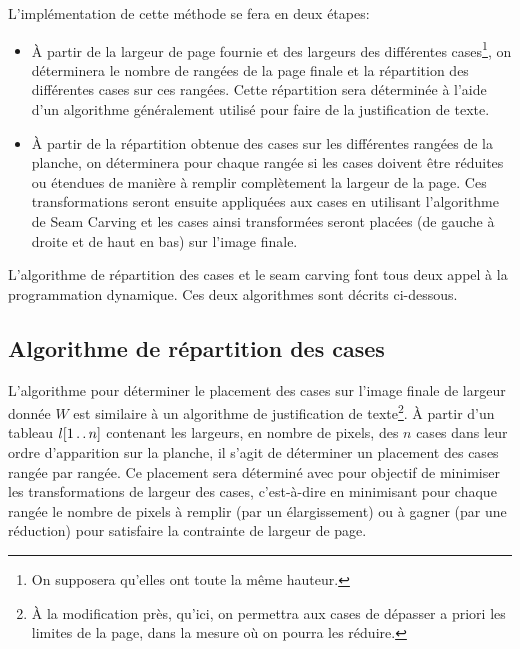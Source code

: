 \documentclass[a4paper,10pt]{article}
\begin{document}
L'implémentation de cette méthode se fera en deux étapes:
\begin{itemize}
\item \`A partir de la largeur de page fournie et des largeurs des
  différentes cases\footnote{On supposera qu'elles ont toute la même
    hauteur.}, on déterminera le nombre de rangées de la page finale
  et la répartition des différentes cases sur ces rangées. Cette
  répartition sera déterminée à l'aide d'un algorithme généralement
  utilisé pour faire de la justification de texte.
\item \`A partir de la répartition obtenue des cases sur les
  différentes rangées de la planche, on déterminera pour chaque rangée
  si les cases doivent être réduites ou étendues de manière à remplir
  complètement la largeur de la page. Ces transformations seront
  ensuite appliquées aux cases en utilisant l'algorithme de Seam
  Carving et les cases ainsi transformées seront placées (de gauche à
  droite et de haut en bas) sur l'image finale.
\end{itemize}
L'algorithme de répartition des cases et le seam carving font tous
deux appel à la programmation dynamique. Ces deux algorithmes sont
décrits ci-dessous.

\subsection{Algorithme de répartition des cases}

L'algorithme pour déterminer le placement des cases sur l'image finale
de largeur donnée $W$ est similaire à un algorithme de justification
de texte\footnote{\`A la modification près, qu'ici, on permettra aux
  cases de dépasser a priori les limites de la page, dans la mesure où
  on pourra les réduire.}. \`A partir d'un tableau $l[1\mathinner{\ldotp\ldotp} n]$
contenant les largeurs, en nombre de pixels, des $n$ cases dans leur
ordre d'apparition sur la planche, il s'agit de déterminer un
placement des cases rangée par rangée. Ce placement sera déterminé
avec pour objectif de minimiser les transformations de largeur des
cases, c'est-à-dire en minimisant pour chaque rangée le nombre de
pixels à remplir (par un élargissement) ou à gagner (par une
réduction) pour satisfaire la contrainte de largeur de page.
\end{document}
